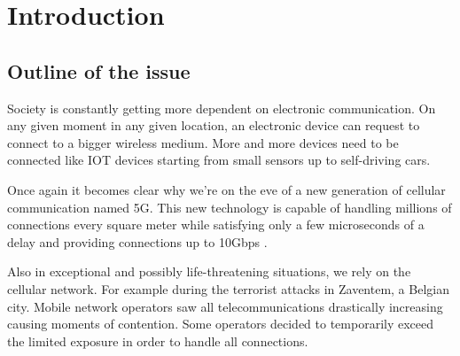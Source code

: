%

\chapter{Introduction}
\label{chap:intro}

\section{Outline of the issue}
\label{sec:issue}

Society is constantly getting more dependent on electronic communication. On any given moment in any given location, an electronic device
can request to connect to a bigger wireless medium. More and more devices need to be connected like IOT devices starting from small sensors up to self-driving cars.

Once again it becomes clear why we're on the eve of a new generation of cellular communication named 5G. 
This new technology is capable of handling millions of connections every square meter %
while satisfying only a few microseconds of a delay and providing connections up to 10Gbps \cite{5GFeatures}.

Also in exceptional and possibly life-threatening situations, we rely on the cellular network. For example during the terrorist attacks in Zaventem, a Belgian city.
Mobile network operators saw all telecommunications drastically increasing causing moments of contention. Some operators decided to temporarily exceed the limited exposure in
order to handle all connections. \cite{baseZaventem}

